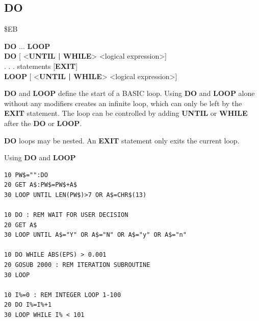 \subsection{DO}
\begin{description}[leftmargin=2cm,style=nextline]
\item [Token:] \$EB
\item [Format:] {\bf DO} ... {\bf LOOP} \\
                {\bf DO} [ <{\bf UNTIL | WHILE}> <logical expression>] \\
                . . . statements [{\bf EXIT}] \\
                {\bf LOOP} [ <{\bf UNTIL | WHILE}> <logical expression>]
\item [Usage:] {\bf DO} and {\bf LOOP} define
               the start of a BASIC loop.
               Using {\bf DO} and {\bf LOOP} alone without any
               modifiers creates an infinite loop, which can only be left
               by the {\bf EXIT} statement. The loop can be
               controlled by adding {\bf UNTIL} or {\bf WHILE}
               after the {\bf DO} or {\bf LOOP}.

\item [Remarks:] {\bf DO} loops may be nested. An {\bf EXIT} statement
               only exits the current loop.
\item [Examples:] Using {\bf DO} and {\bf LOOP}
\begin{tcolorbox}[colback=black,coltext=white]
\verbatimfont{\codefont}
\begin{verbatim}
10 PW$="":DO
20 GET A$:PW$=PW$+A$
30 LOOP UNTIL LEN(PW$)>7 OR A$=CHR$(13)

10 DO : REM WAIT FOR USER DECISION
20 GET A$
30 LOOP UNTIL A$="Y" OR A$="N" OR A$="y" OR A$="n"

10 DO WHILE ABS(EPS) > 0.001
20 GOSUB 2000 : REM ITERATION SUBROUTINE
30 LOOP

10 I%=0 : REM INTEGER LOOP 1-100
20 DO I%=I%+1
30 LOOP WHILE I% < 101
\end{verbatim}
\end{tcolorbox}
\end{description}


\newpage
